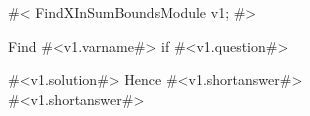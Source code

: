 

#<
FindXInSumBoundsModule v1;
#>

Find #<v1.varname#> if \quad #<v1.question#>

#<v1.solution#>
Hence #<v1.shortanswer#>\\[1.8mm]

#<v1.shortanswer#>


